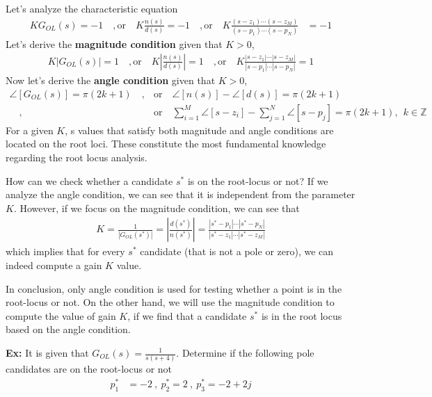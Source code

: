 \documentclass[twoside]{article}
\begin{document}
Let's analyze the characteristic equation 
%
\begin{align*}
K G_{OL}(s) = -1 \quad , \mathrm{or} \quad K \frac{n(s)}{d(s)} = -1 
\quad , \mathrm{or} \quad 
K \frac{(s - z_1) \cdots (s - z_M)}{(s - p_1) \cdots (s - p_N)} 
&= -1
\end{align*}
%
Let's derive the \textbf{magnitude condition} given that $K > 0$,
%
\begin{align*}
K | G_{OL}(s) | = 1 \quad , \mathrm{or} \quad K  \left| \frac{n(s)}{d(s)} \right| = 1 
\quad , \mathrm{or} \quad 
K \frac{|s - z_1| \cdots |s - z_M|}{|s - p_1| \cdots |s - p_N|}  = 1
\end{align*}
%
Now let's derive the \textbf{angle condition} given that $K > 0$,
%
\begin{align*}
\angle [ G_{OL}(s) ] = \pi (2 k + 1) 
\quad ,  &\mathrm{or} \quad 
\angle [n(s)] - \angle [d(s)] = \pi (2 k + 1) 
\\
\quad , &\mathrm{or} \quad 
\sum_{i=1}^{M} \angle [s - z_i] - \sum_{j=1}^{N} \angle [s - p_j]
= \pi (2 k + 1), 
\ \ k \in \mathbb{Z} 
\end{align*}
%
For a given $K$, s values that satisfy both magnitude and angle
conditions are located on the root loci. These constitute the most
fundamental knowledge regarding the root locus analysis.

How can we check whether a candidate $s^*$ is on the root-locus or not?
If we analyze the angle condition, we can see that it is independent 
from the parameter $K$. However, if we focus on the magnitude condition, 
we can see that 
%
\begin{align*}
K = \frac{1}{| G_{OL}(s^*) |} = \left| \frac{d(s^*)}{n(s^*)} \right| = 
\frac{|s^* - p_1| \cdots |s^* - p_N|}{|s^* - z_1| \cdots |s^* - z_M|} 
\end{align*}
%
which implies that for every $s^*$ candidate (that is not a pole or zero), 
we can indeed compute a gain $K$ value.

In conclusion, only angle condition is used for testing 
whether a point is in the root-locus or not. On the other hand, 
we will use the magnitude condition to compute the 
value of gain $K$, if we find that a candidate $s^*$
is in the root locus based on the angle condition.

\newpage

\textbf{Ex:} It is given that $G_{OL}(s) = \frac{1}{s (s+4)}$.
Determine if the following pole candidates are on the 
root-locus or not
%
\begin{align*}
	p_1^* &= -2  \ , \  p_2^* = 2 \ , \ p_3^* = -2 + 2 j
\end{align*}
 
\end{document}
